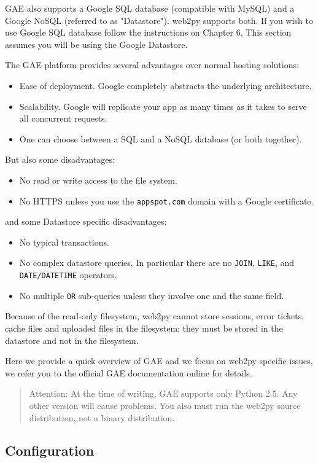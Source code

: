 \documentclass[justified,sixbynine,notoc]{tufte-book}
\def\ft{\small\tt}
\begin{document}
\begin{fullwidth}
GAE also supports a Google SQL database (compatible with MySQL) and a Google NoSQL (referred to as "Datastore").
\noindent web2py supports both. If you wish to use Google SQL database follow the instructions on Chapter 6. This section assumes you will be using the Google Datastore.

The GAE platform provides several advantages over normal hosting solutions:

\begin{itemize}
\item Ease of deployment. Google completely abstracts the underlying architecture.

\item Scalability. Google will replicate your app as many times as it takes to serve all concurrent requests.

\item One can choose between a SQL and a NoSQL database (or both together).
\end{itemize}

But also some disadvantages:
\begin{itemize}
\item No read or write access to the file system.

\item No HTTPS unless you use the {\ft appspot.com} domain with a Google certificate.
\end{itemize}
\noindent and some Datastore specific disadvantages:

\begin{itemize}
\item No typical transactions.

\item No complex datastore queries. In particular there are no {\ft JOIN}, {\ft LIKE}, and {\ft DATE/DATETIME} operators.

\item No multiple {\ft OR} sub-queries unless they involve one and the same field.
\end{itemize}

Because of the read-only filesystem, web2py cannot store sessions, error tickets, cache files and uploaded files in the filesystem; they must be stored in the datastore and not in the filesystem.

Here we provide a quick overview of GAE and we focus on web2py specific issues, we refer you to the official GAE documentation online for details.

\begin{quote}Attention: At the time of writing, GAE supports only Python 2.5. Any other version will cause problems. You also must run the web2py source distribution, not a binary distribution.\end{quote}
\goodbreak\subsection{Configuration}


\end{fullwidth}
\end{document}
